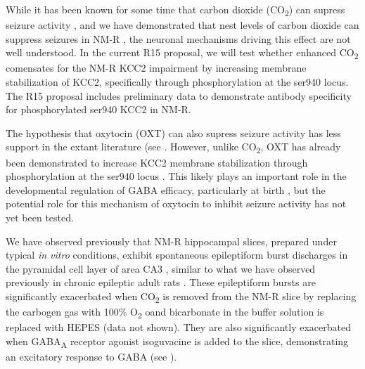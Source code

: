 \documentclass[11pt]{nih}
\begin{document}
\par While it has been known for some time that carbon dioxide (CO\textsubscript{2}) can supress seizure activity \cite{petroianu_2020_singultus}, and we have demonstrated that nest levels of carbon dioxide can suppress seizures in NM-R \cite{zions_2020_nest}, the neuronal mechanisms driving this effect are not well understood. In the current R15 proposal, we will test whether enhanced CO\textsubscript{2} comensates for the NM-R KCC2 impairment by increasing membrane stabilization of KCC2, specifically through phosphorylation at the ser940 locus. The R15 proposal includes preliminary data to demonstrate antibody specificity for phosphorylated ser940 KCC2 in NM-R.
\par The hypothesis that oxytocin (OXT) can also supress seizure activity has less support in the extant literature (see \cite{loyens_2012_proconvulsive,  erbas_2013_oxytocin, panaitescu_2018_oxytocin, wong_2021_nanoparticle }. However, unlike CO\textsubscript{2}, OXT has already been demonstrated to increase KCC2 membrane stabilization through phosphorylation at the ser940 locus \cite{leonzino_2016_timing}. This likely plays an important role in the developmental regulation of GABA efficacy, particularly at birth \cite{tyzio_2006_maternal}, but the potential role for this mechanism of oxytocin to inhibit seizure activity has not yet been tested. 
\par We have observed previously that NM-R hippocampal slices, prepared under typical \textit{in vitro} conditions, exhibit spontaneous epileptiform burst discharges in the pyramidal cell layer of area CA3 \cite{zions_2020_nest}, similar to what we have observed previously in chronic epileptic adult rats \cite{McCloskey2011-sm}. These epileptiform bursts are significantly exacerbated when CO\textsubscript{2} is removed from the NM-R slice by replacing the carbogen gas with 100\% O\textsubscript{2} oand bicarbonate in the buffer solution is replaced with HEPES (data not shown). They are also significantly exacerbated when GABA\textsubscript{A} receptor agonist isoguvacine is added to the slice, demonstrating an excitatory response to GABA (see \cite{zions_2020_nest}).
\end{document}
